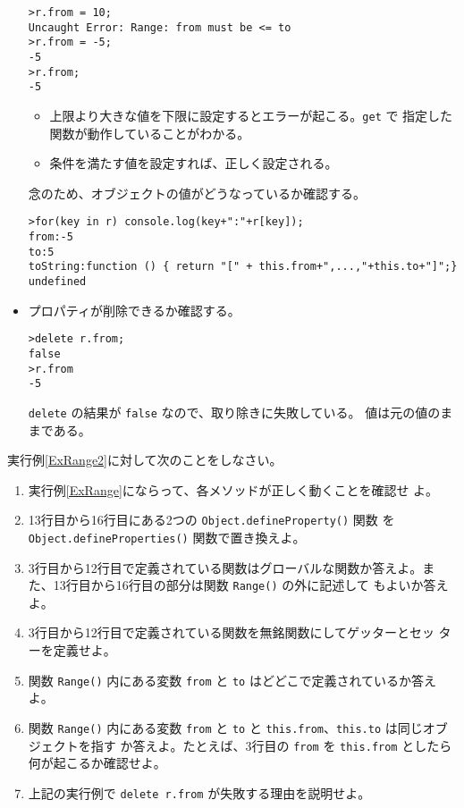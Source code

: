 \begin{Exec}
\begin{itemize}
\begin{Verbatim}
>r.from = 10;
Uncaught Error: Range: from must be <= to 
>r.from = -5;
-5
>r.from;
-5
\end{Verbatim}
\begin{itemize}
 \item 上限より大きな値を下限に設定するとエラーが起こる。\texttt{get} で
       指定した関数が動作していることがわかる。
 \item 条件を満たす値を設定すれば、正しく設定される。
\end{itemize}
念のため、オブジェクトの値がどうなっているか確認する。
\begin{Verbatim}
>for(key in r) console.log(key+":"+r[key]);
from:-5
to:5
toString:function () { return "[" + this.from+",...,"+this.to+"]";}
undefined
\end{Verbatim}
 \item プロパティが削除できるか確認する。
\begin{Verbatim}
>delete r.from;
false
>r.from
-5
\end{Verbatim}
\texttt{delete} の結果が \texttt{false} なので、取り除きに失敗している。
       値は元の値のままである。
\end{itemize}
\end{Exec}
\begin{Prob}
実行例\ref{ExRange2}に対して次のことをしなさい。
\begin{enumerate}\upshape
 \item 実行例\ref{ExRange}にならって、各メソッドが正しく動くことを確認せ
       よ。
 \item 13行目から16行目にある2つの \texttt{Object.defineProperty()} 関数
       を \texttt{Object.defineProperties()} 関数で置き換えよ。
 \item 3行目から12行目で定義されている関数はグローバルな関数か答えよ。ま
       た、13行目から16行目の部分は関数 \texttt{Range()} の外に記述して
       もよいか答えよ。
 \item 3行目から12行目で定義されている関数を無銘関数にしてゲッターとセッ
       ターを定義せよ。
 \item 関数 \texttt{Range()} 内にある変数 \texttt{from} と \texttt{to}
       はどどこで定義されているか答えよ。
 \item 関数 \texttt{Range()} 内にある変数 \texttt{from} と \texttt{to}
       と \texttt{this.from}、\texttt{this.to} は同じオブジェクトを指す
       か答えよ。たとえば、3行目の \texttt{from} を \texttt{this.from}
       としたら何が起こるか確認せよ。
 \item 上記の実行例で \texttt{delete r.from} が失敗する理由を説明せよ。
\end{enumerate}
\end{Prob}
\fi